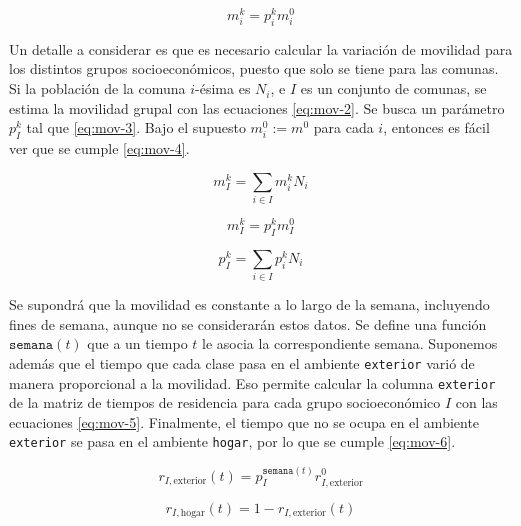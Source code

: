 \begin{equation}\label{eq:mov-1}
m_i^k = p_i^k m_i^0
\end{equation}

Un detalle a considerar es que es necesario calcular la variación de movilidad para los distintos grupos socioeconómicos, puesto que solo se tiene para las comunas. Si la población de la comuna \(i\)-ésima es \(N_i\), e \(I\) es un conjunto de comunas, se estima la movilidad grupal con las ecuaciones \ref{eq:mov-2}. Se busca un parámetro \(p_I^k\) tal que \ref{eq:mov-3}. Bajo el supuesto \(m_i^0 := m^0\) para cada \(i\), entonces es fácil ver que se cumple \ref{eq:mov-4}.

\begin{equation}\label{eq:mov-2}
m^k_I = \sum_{i \in I}m^k_i N_i
\end{equation}


\begin{equation}\label{eq:mov-3}
m_I^k = p_I^k m_I^0
\end{equation}


\begin{equation}\label{eq:mov-4}
p_I^k = \sum_{i \in I} p_i^k N_i
\end{equation}

Se supondrá que la movilidad es constante a lo largo de la semana, incluyendo fines de semana, aunque no se considerarán estos datos. Se define una función \(\mathtt{semana}(t)\) que a un tiempo \(t\) le asocia la correspondiente semana. Suponemos además que el tiempo que cada clase pasa en el ambiente \texttt{exterior} varió de manera proporcional a la movilidad. Eso permite calcular la columna \texttt{exterior} de la matriz de tiempos de residencia para cada grupo socioeconómico \(I\) con las ecuaciones \ref{eq:mov-5}. Finalmente, el tiempo que no se ocupa en el ambiente \texttt{exterior} se pasa en el ambiente \texttt{hogar}, por lo que se cumple \ref{eq:mov-6}.

\begin{equation}\label{eq:mov-5}
r_{I, \text{exterior}}(t) = p_I^{\mathtt{semana}(t)} r_{I,\text{exterior}}^0
\end{equation}






\begin{equation}\label{eq:mov-6}
r_{I, \text{hogar}}(t) = 1 - r_{I,\text{exterior}}(t)
\end{equation}